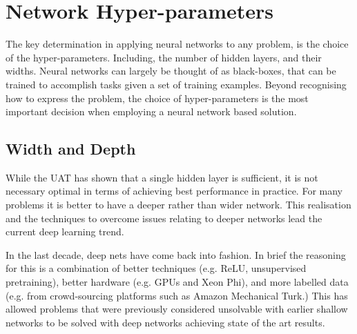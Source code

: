 \documentclass[12pt,parskip]{komatufte}
\begin{document}
\section{Network Hyper-parameters}

The key determination in applying neural networks to any problem,
is the choice of the hyper-parameters.
Including, the number of hidden layers, and their widths.
Neural networks can largely be thought of as black-boxes,
that can be trained to  accomplish tasks given a set of training examples.
Beyond recognising how to express the problem,
the choice of hyper-parameters is the most important decision when employing a neural network based solution.


\subsection{Width and Depth}

While the UAT has shown that a single hidden layer is sufficient,
it is not necessary optimal in terms of achieving best performance in practice.
For many problems it is better to have a deeper rather than wider network.
This realisation and the techniques to overcome issues relating to deeper networks lead the current deep learning trend.




In the last decade, deep nets have come back into fashion.
In brief the reasoning for this is a combination of better techniques (e.g. ReLU, unsupervised pretraining),
better hardware (e.g. GPUs and Xeon Phi), and more labelled data (e.g. from crowd-sourcing platforms such as Amazon Mechanical Turk.)
This has allowed problems that were previously considered unsolvable with earlier shallow networks to be solved with deep networks achieving state of the art results.
\end{document}
